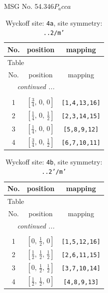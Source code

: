 \documentclass[fleqn,8pt]{jsarticle}
\begin{document}
\setcounter{MaxMatrixCols}{32}

\renewcommand{\tablename}{Table~}
\renewcommand{\figurename}{Figure~}
\begin{center}
\LARGE
MSG No. 54.346\quad$P_{a}cca$
\end{center}
\renewcommand{\arraystretch}{1.2}
\begin{longtable}{ccc}
\caption{Wyckoff site: {\tt 4a}, site symmetry: {\tt ..2/m'}}
 \\
 \hline \hline
No. & position & mapping \\ \hline \endfirsthead

\multicolumn{2}{l}{\tablename\ \thetable{}} \\
 \hline \hline
No. & position & mapping \\ \hline \endhead

 \hline \hline
\multicolumn{2}{r}{\footnotesize\it continued ...} \\ \endfoot

 \hline \hline
\multicolumn{2}{r}{} \\ \endlastfoot

1 & $\left[ \frac{3}{4},\, 0,\, 0 \right]$ & {\tt [1,4,13,16]} \\ \hline
2 & $\left[ \frac{1}{4},\, 0,\, \frac{1}{2} \right]$ & {\tt [2,3,14,15]} \\ \hline
3 & $\left[ \frac{1}{4},\, 0,\, 0 \right]$ & {\tt [5,8,9,12]} \\ \hline
4 & $\left[ \frac{3}{4},\, 0,\, \frac{1}{2} \right]$ & {\tt [6,7,10,11]} \\
\end{longtable}
\renewcommand{\arraystretch}{1.2}
\begin{longtable}{ccc}
\caption{Wyckoff site: {\tt 4b}, site symmetry: {\tt ..2'/m'}}
 \\
 \hline \hline
No. & position & mapping \\ \hline \endfirsthead

\multicolumn{2}{l}{\tablename\ \thetable{}} \\
 \hline \hline
No. & position & mapping \\ \hline \endhead

 \hline \hline
\multicolumn{2}{r}{\footnotesize\it continued ...} \\ \endfoot

 \hline \hline
\multicolumn{2}{r}{} \\ \endlastfoot

1 & $\left[ 0,\, \frac{1}{2},\, 0 \right]$ & {\tt [1,5,12,16]} \\ \hline
2 & $\left[ \frac{1}{2},\, \frac{1}{2},\, \frac{1}{2} \right]$ & {\tt [2,6,11,15]} \\ \hline
3 & $\left[ 0,\, \frac{1}{2},\, \frac{1}{2} \right]$ & {\tt [3,7,10,14]} \\ \hline
4 & $\left[ \frac{1}{2},\, \frac{1}{2},\, 0 \right]$ & {\tt [4,8,9,13]} \\
\end{longtable}
\end{document}
